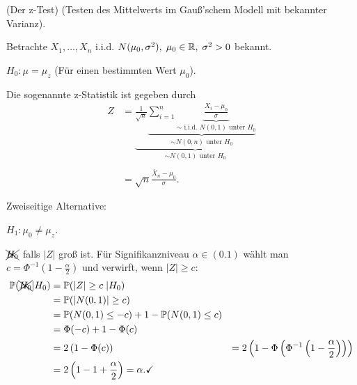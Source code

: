 \documentclass{tstextbook}
\begin{document}
\begin{example}(Der z-Test)
	(Testen des Mittelwerts im Gauß'schem Modell mit bekannter Varianz). 
	
	Betrachte $ X_1,\ldots,X_n $ i.i.d. $ N(\mu_0,\sigma^2), \; \mu_0\in\mathbb R, \;\sigma^2>0 $ bekannt. 
	
	$ H_0\colon \mu=\mu_z $ (Für einen bestimmten Wert $\mu_0$). 
	
	Die sogenannte z-Statistik ist gegeben durch 
	\[
	\begin{aligned}
	Z & = \underbrace{\frac{1}{\sqrt{n}}\underbrace{\sum_{i=1}^{n}\underbrace{\frac{X_i-\mu_0}{\sigma}}_{\sim \text{ i.i.d. } N(0,1) \text{ unter } H_0}}_{\sim N(0,n) \text{ unter } H_0}}_{\sim N(0,1) \text{ unter } H_0} \\
	\\
	  & = \sqrt{n}\frac{\bar{X}_n-\mu_0}{\sigma}.
	\end{aligned}
	\]
	
	Zweiseitige Alternative: 
	
	$ H_1\colon \mu_0\ne\mu_z $.
	
	$ \xcancel{H_0} $ falls $ |Z| $ groß ist. Für Signifikanzniveau $ \alpha\in (0.1) $ wählt man $ c=\Phi^{-1}\left(1-\frac{\alpha}{2}\right) $ und verwirft, wenn $ |Z|\ge c $: 
	\[
	\begin{aligned}
		\mathbb P(\xcancel{H_0}|H_0) & = \mathbb P(|Z|\ge c\;|H_0) \\
		& = \mathbb P(|N(0,1)|\ge c) \\
		& = \mathbb P(N(0,1)\le -c)+1-\mathbb P(N(0,1)\le c) \\
		& = \Phi(-c)+1-\Phi(c) \\
		& = 2\left( 1 - \Phi(c) \right)
		& = 2\left(1-\Phi\left(\Phi^{-1}\left(1-\frac{\alpha}{2}\right)\right)\right) \\
		& = 2\left(1-1+\frac{\alpha}{2}\right) = \alpha. \checkmark
	\end{aligned}
	\]
	
		\begin{center}
	\end{center}
	

\end{example}
\end{document}
